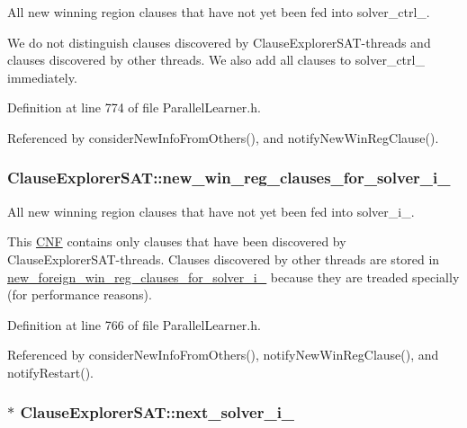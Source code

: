All new winning region clauses that have not yet been fed into solver\-\_\-ctrl\-\_\-. 

We do not distinguish clauses discovered by Clause\-Explorer\-S\-A\-T-\/threads and clauses discovered by other threads. We also add all clauses to solver\-\_\-ctrl\-\_\- immediately. 

Definition at line 774 of file Parallel\-Learner.\-h.



Referenced by consider\-New\-Info\-From\-Others(), and notify\-New\-Win\-Reg\-Clause().

\hypertarget{classClauseExplorerSAT_a2c3e73b4c0529b9139354a965d34e81f}{
\subsubsection[{new\-\_\-win\-\_\-reg\-\_\-clauses\-\_\-for\-\_\-solver\-\_\-i\-\_\-}]{ Clause\-Explorer\-S\-A\-T\-::new\-\_\-win\-\_\-reg\-\_\-clauses\-\_\-for\-\_\-solver\-\_\-i\-\_\-\hspace{0.3cm}{\ttfamily [protected]}}}\label{classClauseExplorerSAT_a2c3e73b4c0529b9139354a965d34e81f}


All new winning region clauses that have not yet been fed into solver\-\_\-i\-\_\-. 

This \hyperlink{classCNF}{C\-N\-F} contains only clauses that have been discovered by Clause\-Explorer\-S\-A\-T-\/threads. Clauses discovered by other threads are stored in \hyperlink{classClauseExplorerSAT_a70c8edd590d75994ee354d591909cd35}{new\-\_\-foreign\-\_\-win\-\_\-reg\-\_\-clauses\-\_\-for\-\_\-solver\-\_\-i\-\_\-} because they are treaded specially (for performance reasons). 

Definition at line 766 of file Parallel\-Learner.\-h.



Referenced by consider\-New\-Info\-From\-Others(), notify\-New\-Win\-Reg\-Clause(), and notify\-Restart().

\hypertarget{classClauseExplorerSAT_abbaa9b938df08f811dd361216527176c}{
\subsubsection[{next\-\_\-solver\-\_\-i\-\_\-}]{$\ast$ Clause\-Explorer\-S\-A\-T\-::next\-\_\-solver\-\_\-i\-\_\-\hspace{0.3cm}{\ttfamily [protected]}}}\label{classClauseExplorerSAT_abbaa9b938df08f811dd361216527176c}


